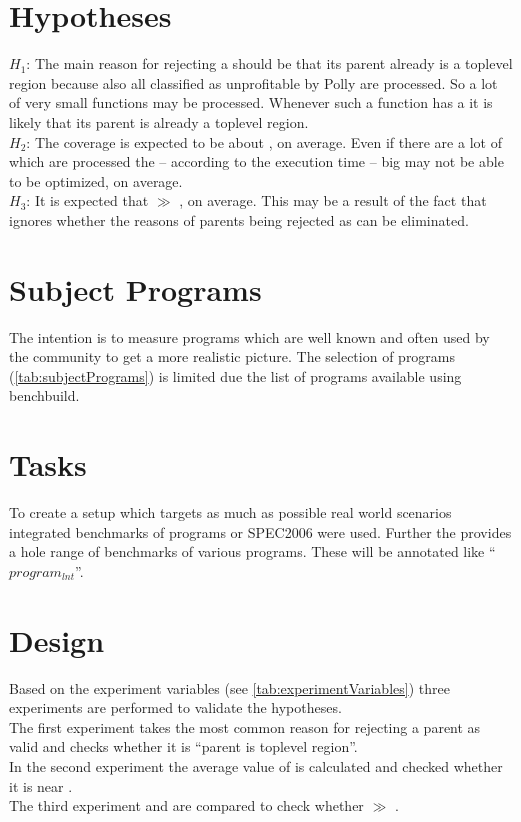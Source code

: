 \section{Hypotheses}
\(H_1\): The main reason for rejecting a \scop should be that its parent already is a toplevel region because also all \scops classified as unprofitable by Polly are processed.
So a lot of very small functions may be processed.
Whenever such a function has a \scop it is likely that its parent is already a toplevel region.\\
\(H_2\): The coverage \dyncovs is expected to be about \hTwoAbout, on average.
Even if there are a lot of \scops which are processed the -- according to the execution time -- big \scops may not be able to be optimized, on average.\\
\(H_3\): It is expected that \dyncovp \(\gg\) \dyncovs, on average.
This may be a result of the fact that \dyncovp ignores whether the reasons of parents being rejected as \scop can be eliminated.\\

\section{Subject Programs}
The intention is to measure programs which are well known and often used by the community to get a more realistic picture.
The selection of programs (\autoref{tab:subjectPrograms}) is limited due the list of programs available using benchbuild.

\section{Tasks}
To create a setup which targets as much as possible real world scenarios integrated benchmarks of programs or SPEC2006 were used.
Further the \lnt provides a hole range of benchmarks of various programs.
These will be annotated like \enquote{\(program_{lnt}\)}.

\section{Design}
Based on the experiment variables (see \autoref{tab:experimentVariables}) three experiments are performed to validate the hypotheses.\\
The first experiment takes the most common reason for rejecting a parent as valid \scop and checks whether it is \enquote{parent is toplevel region}.\\
In the second experiment the average value of \dyncovs is calculated and checked whether it is near \hTwoAbout.\\
The third experiment \dyncovp and \dyncovs are compared to check whether \dyncovp \(\gg\) \dyncovs.


